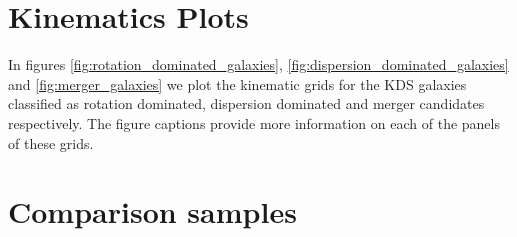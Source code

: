 \documentclass[fleqn,usenatbib]{mn2e}
\begin{document}
\appendix

\section{Kinematics Plots}\label{app:kinematics_plots}
In figures \ref{fig:rotation_dominated_galaxies}, \ref{fig:dispersion_dominated_galaxies} and \ref{fig:merger_galaxies} we plot the kinematic grids for the KDS galaxies classified as rotation dominated, dispersion dominated and merger candidates respectively.
The figure captions provide more information on each of the panels of these grids.

\section{Comparison samples}\label{app:comparison_samples}
\end{document}
